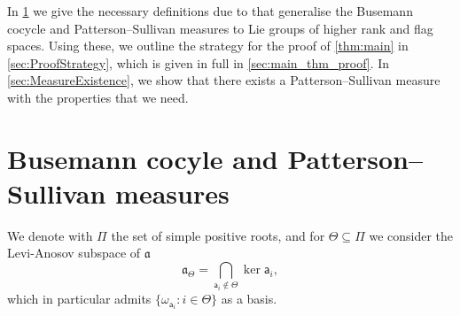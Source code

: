 \documentclass{report}
\begin{document}
In \cref{sec:busemann} we give the necessary definitions due to \cite{quint2002mesures} that generalise the Busemann cocycle and Patterson--Sullivan measures to Lie groups of higher rank and flag spaces.
Using these, we outline the strategy for the proof of \cref{thm:main} in \cref{sec:ProofStrategy}, which is given in full in \cref{sec:main_thm_proof}.
In \cref{sec:MeasureExistence}, we show that there exists a Patterson--Sullivan measure with the properties that we need. 

\section{Busemann cocyle and Patterson--Sullivan measures}\label{sec:busemann}
We denote with $\Pi$ the set of simple positive roots, and for $\Theta \subseteq \Pi$ we consider the Levi-Anosov subspace of $\mathfrak a$
\[
    \mathfrak a_\Theta = \bigcap_{\mathsf{a}_i \notin \Theta} \ker \mathsf{a}_i,
\]
which in particular admits $\{ \omega_{\mathsf{a}_i} : i \in \Theta \}$ as a basis.
\end{document}
